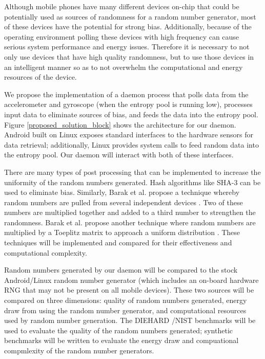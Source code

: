 \documentclass[conference]{IEEEtran}
\begin{document}
Although mobile phones have many different devices on-chip that could be potentially used as sources of randomness for a random number generator,
most of these devices have the potential for strong bias.  Additionally, because of the operating environment polling these devices with high
frequency can cause serious system performance and energy issues.  Therefore it is necessary to not only use devices that have high quality randomness,
but to use those devices in an intelligent manner so as to not overwhelm the computational and energy resources of the device.

We propose the implementation of a daemon process that polls data from the accelerometer and gyroscope (when the entropy pool is running low), processes
input data to eliminate sources of bias, and feeds the data into the entropy pool.  Figure \ref{proposed_solution_block} shows the architecture for
our daemon.  Android built on Linux exposes standard interfaces to the hardware sensors for data retrieval; additionally, Linux provides system calls
to feed random data into the entropy pool.  Our daemon will interact with both of these interfaces.

There are many types of post processing that can be implemented to increase the uniformity of the random numbers generated.  Hash algorithms like SHA-3
\cite{keccak} can be used to eliminate bias.  Similarly, Barak et al. propose a technique whereby random numbers are pulled from several independent
devices \cite{independent_devices}.  Two of these numbers are multiplied together and added to a third number to strengthen the randomness.  Barak et
al. propose another technique where random numbers are multiplied by a Toeplitz matrix to approach a uniform distribution \cite{true_rng}.  These
techniques will be implemented and compared for their effectiveness and computational complexity.

Random numbers generated by our daemon will be compared to the stock Android/Linux random number generator (which includes an on-board hardware
RNG that may not be present on all mobile devices).  These two sources will be compared on three dimensions: quality of random numbers generated,
energy draw from using the random number generator, and computational resources used by random number generation.  The DIEHARD \cite{diehard}/NIST 
\cite{nist} benchmarks will be used to evaluate the quality of the random numbers generated; synthetic benchmarks will be written to evaluate the energy
draw and compuational compmlexity of the random number generators.
\end{document}
